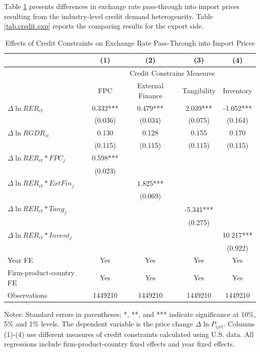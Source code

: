 \documentclass[12pt]{article}
\begin{document}
Table \ref{tab.credit} presents differences in exchange rate pass-through into import prices resulting from the industry-level credit demand heterogeneity. Table \ref{tab.credit.exp} reports the comparing results for the export side. 

\begin{table}[htbp]
	\centering
	\caption{Effects of Credit Constraints on Exchange Rate Pass-Through into Import Prices}
	\begin{threeparttable}	
		\begin{tabular}{lcccc}
			\toprule
			& (1)   & (2)   & (3)   & (4) \\
			\midrule
			 & \multicolumn{4}{c}{Credit Constrains Measures} \\
			& FPC   & External Finance & Tangibility & Inventory \\
			\midrule
			$\Delta \ln RER_{ct}$ & 0.332*** & 0.479*** & 2.039*** & -1.052*** \\
			& (0.036) & (0.034) & (0.075) & (0.164) \\
			$\Delta \ln RGDR_{ct}$ & 0.130 & 0.128 & 0.155 & 0.170 \\
			& (0.115) & (0.115) & (0.115) & (0.115) \\
			$\Delta \ln RER_{ct}*FPC_{j}$ & 0.598*** &       &       &  \\
			& (0.023) &       &       &  \\
			$\Delta \ln RER_{ct}*ExtFin_{j}$ &       & 1.825*** &       &  \\
			&       & (0.069) &       &  \\
			$\Delta \ln RER_{ct}*Tang_{j}$ &       &       & -5.341*** &  \\
			&       &       & (0.275) &  \\
			$\Delta \ln RER_{ct}*Invent_{j}$ &       &       &       & 10.217*** \\
			&       &       &       & (0.922) \\
			Year FE  & Yes   & Yes   & Yes   & Yes \\
			Firm-product-country FE & Yes   & Yes   & Yes   & Yes \\
			Observations & 1449210 & 1449210 & 1449210 & 1449210 \\

			\bottomrule
		\end{tabular}
		\begin{tablenotes}
			\footnotesize
			\item[Notes:] Standard errors in parentheses; *, **, and *** indicate significance at 10\%, 5\% and 1\% levels. The dependent variable is the price change $\Delta \ln P_{ijct}$. Columns (1)-(4) use different measures of credit constraints calculated using U.S. data. All regressions include firm-product-country fixed effects and year fixed effects.
		\end{tablenotes}
	\end{threeparttable}
	\label{tab.credit}
\end{table}
\end{document}

